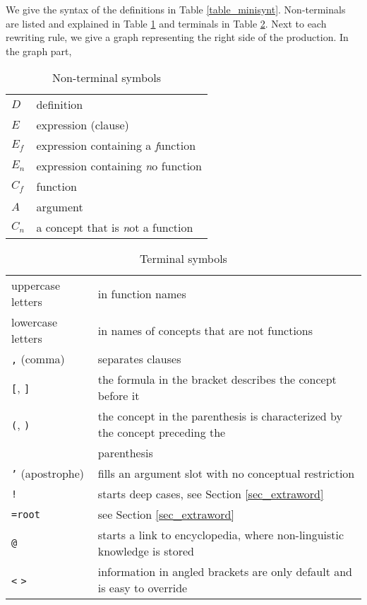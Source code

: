 \documentclass[a4paper,10pt]{article}
\begin{document}
We give the syntax of the definitions in Table \ref{table_minisynt}. Non-terminals are listed and explained in Table \ref{table_nont} and terminals  in Table \ref{table_termin}. Next to each rewriting rule, we give a graph representing the right side of the production. In the graph part,
\begin{table}
\begin{center}
\begin{tabular}{ll}
 $D$ & definition
\\ $ E $ & expression (clause)
\\ $ E_f $ & expression containing a \emph function
\\ $ E_n  $ & expression containing \emph no function
\\ $ C_f $ & function
\\ $ A $ & argument 
\\ $ C_n $ & a concept that is \emph not a function
\end{tabular}
\end{center}
\caption{Non-terminal symbols}
\label{table_nont}
\end{table}
\begin{table}
\begin{center}
\begin{tabular}{ll}
 uppercase letters & in function names
\\ lowercase letters & in names of concepts that are not functions
\\ \texttt{,} (comma) & separates clauses
\\ \texttt{[}, \texttt{]} & the formula in the bracket describes the concept before it
\\ \texttt{(}, \texttt{)} & the concept in the parenthesis is characterized by the concept preceding the \\ & parenthesis
\\ \texttt{'} (apostrophe) & fills an argument slot with no conceptual restriction
\\ \texttt{!} & starts deep cases, see Section \ref{sec_extraword}
\\ \texttt{=root} & see Section \ref{sec_extraword}
\\ \texttt{@} & starts a link to encyclopedia, where non-linguistic knowledge is stored
\\ \texttt{<} \texttt{>}& information in angled brackets are only default and is easy to override
\end{tabular}
\end{center}
\caption{Terminal symbols}
\label{table_termin}
\end{table}
\end{document}
